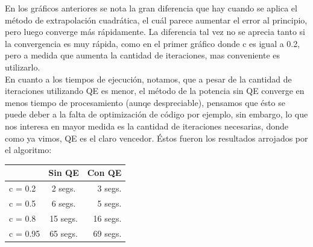En los gr\'aficos anteriores se nota la gran diferencia que hay cuando se aplica el m\'etodo de extrapolaci\'on cuadr\'atica, el cu\'al parece aumentar el error al principio, pero luego converge m\'as r\'apidamente. La diferencia tal vez no se aprecia tanto si la convergencia es muy r\'apida, como en el primer gr\'afico donde c es igual a 0.2, pero a medida que aumenta la cantidad de iteraciones, mas conveniente es utilizarlo.\\

En cuanto a los tiempos de ejecuci\'on, notamos, que a pesar de la cantidad de iteraciones utilizando QE es menor, el m\'etodo de la potencia sin QE converge en menos tiempo de procesamiento (aunqe despreciable), pensamos que \'esto se puede deber a la falta de optimizaci\'on de c\'odigo por ejemplo, sin embargo, lo que nos interesa en mayor medida es la cantidad de iteraciones necesarias, donde como ya vimos, QE es el claro vencedor. 
\'Estos fueron los resultados arrojados por el algoritmo: \\

\begin{tabular}{ l | c | r}
  & Sin QE & Con QE\\
  \hline
  c = 0.2 & 2 segs. & 3 segs.\\
  \hline
  c = 0.5 & 6 segs. & 5 segs.\\
  \hline
  c = 0.8 & 15 segs. & 16 segs. \\
  \hline
  c = 0.95 & 65 segs. & 69 segs. \\
  \hline
\end{tabular}

